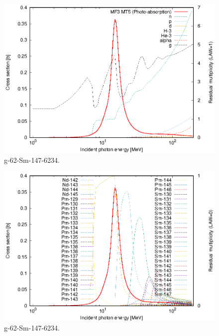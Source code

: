 \begin{figure}
 \includegraphics[width=\linewidth]{eps/g_62-Sm-147_6234.eps}
  \caption{g-62-Sm-147-6234.}
\end{figure}
\begin{figure}
 \includegraphics[width=\linewidth]{eps-law0/g_62-Sm-147_6234.eps}
 \caption{g-62-Sm-147-6234.}
\end{figure}
\newpage \clearpage

